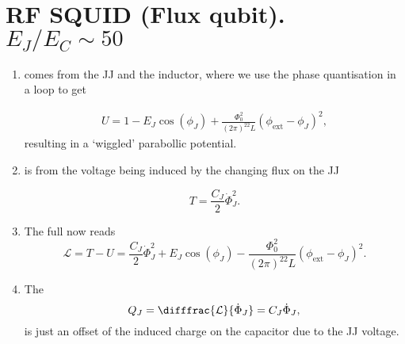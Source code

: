 
\
\newpage
\section{RF SQUID (Flux qubit). $ E_J/E_C\sim 50 $ \label{sec:rfSquid}}
  

 

\begin{enumerate}
\item {} comes from the  JJ and the inductor,  where we use
  the phase quantisation in a loop to get
  
  {\begin{equation}
      \label{l3-energy1}
      \begin{aligned}
        U = 1 -E_J\cos(\phi_J) + \frac{\Phi_0^2}{(2\pi)^22L}(\phi_\text{ext}-\phi_J)^2,
      \end{aligned}
    \end{equation}}
  \noindent resulting in a `wiggled' parabollic potential.

\item  {}  is  from the  voltage being  induced by  the
  changing flux on the JJ
  
  \begin{equation}\label{key}
    T = \frac{C_J}{2}\dot{\Phi}_J^2.
  \end{equation}
  
\item The full  now reads
  \begin{equation}\label{key}
    \mathcal{L} = T - U = \frac{C_J}{2}\dot{\Phi}_J^2 + E_J\cos(\phi_J) - \frac{\Phi_0^2}{(2\pi)^22L}(\phi_\text{ext}-\phi_J)^2.
  \end{equation}
  
\item The \textbf{}
  \begin{equation}\label{key}
    Q_J = \difffrac{\mathcal{L}}{\dot{\Phi}_J} = C_J\dot{\Phi}_J,
  \end{equation}
  \noindent is just an offset of the induced charge on the capacitor due to the JJ voltage.
  

\end{enumerate}

